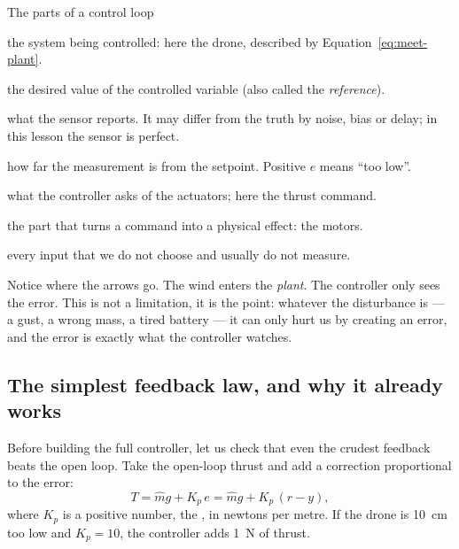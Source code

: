 \begin{definition}{The parts of a control loop}
\begin{description}[leftmargin=0pt, itemsep=3pt, font=\sffamily\small\bfseries]
  \item[Plant] the system being controlled: here the drone, described by Equation~\eqref{eq:meet-plant}.
  \item[Setpoint $r$] the desired value of the controlled variable (also called the \emph{reference}).
  \item[Measurement $y$] what the sensor reports. It may differ from the truth by noise, bias or delay; in this lesson the sensor is perfect.
  \item[Error $e = r - y$] how far the measurement is from the setpoint. Positive $e$ means \enquote{too low}.
  \item[Command $u$] what the controller asks of the actuators; here the thrust command.
  \item[Actuator] the part that turns a command into a physical effect: the motors.
  \item[Disturbance $d$] every input that we do not choose and usually do not measure.
\end{description}
\end{definition}

Notice where the arrows go. The wind enters the \emph{plant}. The controller only sees the error. This is not a limitation, it is the point: whatever the disturbance is — a gust, a wrong mass, a tired battery — it can only hurt us by creating an error, and the error is exactly what the controller watches.

\subsection{The simplest feedback law, and why it already works}
Before building the full controller, let us check that even the crudest feedback beats the open loop. Take the open-loop thrust and add a correction proportional to the error:
\begin{equation}\label{eq:meet-p}
  T = \hat m g + K_p\,e = \hat m g + K_p\,(r - y),
\end{equation}
where $K_p$ is a positive number, the , in newtons per metre. If the drone is \SI{10}{cm} too low and $K_p = 10$, the controller adds \SI{1}{N} of thrust.

